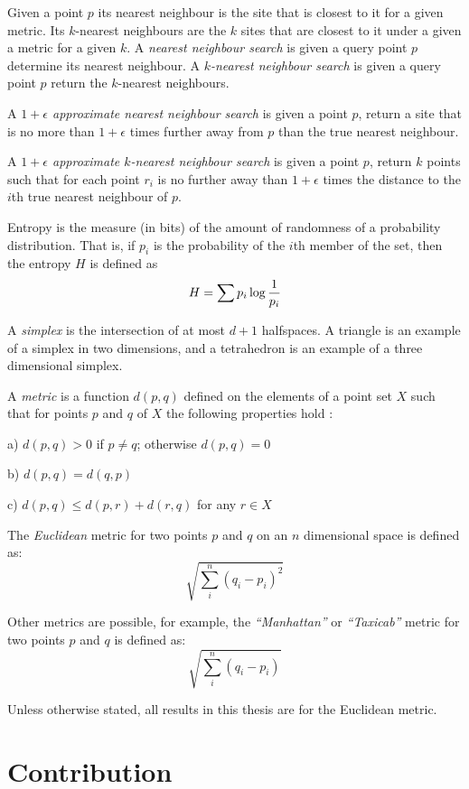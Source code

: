 \documentclass[mcs]{scsthesis}
\begin{document}
Given a point \(p\) its nearest neighbour is the site that is closest to it
for a given metric. Its $k$-nearest neighbours are the $k$ sites that are
closest to it under a given a metric for a given $k$.  A \emph{nearest neighbour
search} is given a query point \(p\) determine its nearest neighbour.
A \emph{\(k\)-nearest neighbour search} is given a query point \(p\) return the
$k$-nearest neighbours.

A \emph{\(1 + \epsilon\) approximate nearest neighbour search} is given a point
\(p\), return a site that is no more than \(1 + \epsilon\) times further away
from $p$ than the true nearest neighbour.

A \emph{\(1 + \epsilon\) approximate \(k\)-nearest neighbour search} is given a
point \(p\), return \(k\) points such that for each point \(r_i\) is no further
away than \(1 + \epsilon\) times the distance to the \(i\)th true nearest
neighbour of $p$.

Entropy is the measure (in bits) of the amount of randomness of a probability
distribution.  That is, if \(p_i\) is the probability of the $i$th member of the
set, then the entropy \(H\) is defined as
$$
H = \sum{ p_i \log{1 \over p_i}}
$$

A \emph{simplex} is the intersection of at most \(d + 1\) halfspaces. A triangle
is an example of a simplex in two dimensions, and a tetrahedron is an example of
a three dimensional simplex.

A \emph{metric} is a function \(d(p,q)\) defined on the elements of a point set
\(X\) such that for points \(p\) and \(q\) of \(X\) the following properties
hold \cite{rudin}:

a) \(d(p,q) > 0\) if \(p \ne q\); otherwise \(d(p, q) = 0\)

b) \(d(p,q) = d(q, p)\)

c) \(d(p,q) \le d(p, r) + d(r, q)\) for any \(r \in X\) 

The \emph{Euclidean} metric for two points \(p\) and \(q\) on an \(n\)
dimensional space is defined as:
$$
\sqrt{\sum_i^n{(q_i-p_i)^2}}
$$

Other metrics are possible, for example, the \emph{``Manhattan''} or
\emph{``Taxicab''} metric for two points \(p\) and \(q\) is defined as:
$$
\sqrt{\sum_i^n{(q_i-p_i)}}
$$

Unless otherwise stated, all results in this thesis are for the Euclidean
metric.

\section{Contribution}
\end{document}
